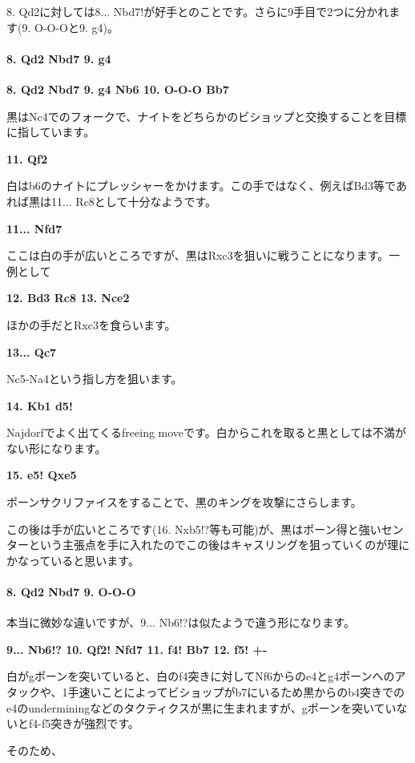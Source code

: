 8. Qd2に対しては8... Nbd7!が好手とのことです。さらに9手目で2つに分かれます(9. O-O-Oと9. g4)。

\paragraph{8. Qd2 Nbd7 9. g4}
\mbox{}\newline

{\bf 8. Qd2 Nbd7 9. g4 Nb6 10. O-O-O Bb7}

黒はNc4でのフォークで、ナイトをどちらかのビショップと交換することを目標に指しています。

{\bf 11. Qf2}

白はb6のナイトにプレッシャーをかけます。この手ではなく、例えばBd3等であれば黒は11... Rc8として十分なようです。

{\bf 11... Nfd7}

ここは白の手が広いところですが、黒はRxc3を狙いに戦うことになります。一例として

{\bf 12. Bd3 Rc8 13. Nce2}

ほかの手だとRxc3を食らいます。

{\bf 13... Qc7}

Nc5-Na4という指し方を狙います。

{\bf 14. Kb1 d5!}

Najdorfでよく出てくるfreeing moveです。白からこれを取ると黒としては不満がない形になります。

{\bf 15. e5! Qxe5}

ポーンサクリファイスをすることで、黒のキングを攻撃にさらします。

この後は手が広いところです(16. Nxb5!?等も可能)が、黒はポーン得と強いセンターという主張点を手に入れたのでこの後はキャスリングを狙っていくのが理にかなっていると思います。

\paragraph{8. Qd2 Nbd7 9. O-O-O}
\mbox{}\newline
本当に微妙な違いですが、9... Nb6!?は似たようで違う形になります。

{\bf 9... Nb6!? 10. Qf2! Nfd7 11. f4! Bb7 12. f5! +-}

白がgポーンを突いていると、白のf4突きに対してNf6からのe4とg4ポーンへのアタックや、1手速いことによってビショップがb7にいるため黒からのb4突きでのe4のunderminingなどのタクティクスが黒に生まれますが、gポーンを突いていないとf4-f5突きが強烈です。

そのため、

